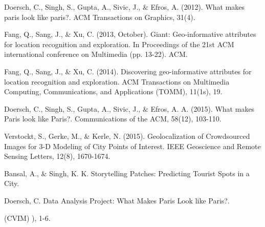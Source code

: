 \noindent
Doersch, C., Singh, S., Gupta, A., Sivic, J., $\&$ Efros, A. (2012). What makes paris look like paris?. ACM Transactions on Graphics, 31(4).


\noindent
Fang, Q., Sang, J., $\&$ Xu, C. (2013, October). Giant: Geo-informative attributes for location recognition and exploration. In Proceedings of the 21st ACM international conference on Multimedia (pp. 13-22). ACM.


\noindent
Fang, Q., Sang, J., $\&$ Xu, C. (2014). Discovering geo-informative attributes for location recognition and exploration. ACM Transactions on Multimedia Computing, Communications, and Applications (TOMM), 11(1s), 19.



\noindent
Doersch, C., Singh, S., Gupta, A., Sivic, J., $\&$ Efros, A. A. (2015). What makes Paris look like Paris?. Communications of the ACM, 58(12), 103-110.


\noindent
Verstockt, S., Gerke, M., $\&$ Kerle, N. (2015). Geolocalization of Crowdsourced Images for 3-D Modeling of City Points of Interest. IEEE Geoscience and Remote Sensing Letters, 12(8), 1670-1674.


\noindent
Bansal, A., $\&$ Singh, K. K. Storytelling Patches: Predicting Tourist Spots in a City.


\noindent
Doersch, C. Data Analysis Project: What Makes Paris Look like Paris?.


\noindent
{}
(CVIM) ), 1-6.